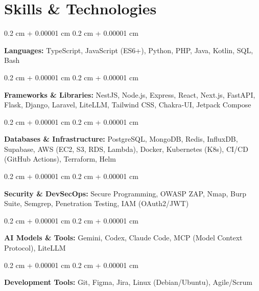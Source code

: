 \documentclass[10pt, letterpaper]{article}
\newenvironment{onecolentry}{
    \begin{adjustwidth}{
        0.2 cm + 0.00001 cm
    }{
        0.2 cm + 0.00001 cm
    }
}{
    \end{adjustwidth}
} %
\begin{document}
    \section{Skills \& Technologies}



        \begin{onecolentry}
            \textbf{Languages:} TypeScript, JavaScript (ES6+), Python, PHP, Java, Kotlin, SQL, Bash
        \end{onecolentry}

        \vspace{0.2 cm}

        \begin{onecolentry}
            \textbf{Frameworks \& Libraries:} NestJS, Node.js, Express, React, Next.js, FastAPI, Flask, Django, Laravel, LiteLLM, Tailwind CSS, Chakra-UI, Jetpack Compose
        \end{onecolentry}

        \vspace{0.2 cm}

        \begin{onecolentry}
            \textbf{Databases \& Infrastructure:} PostgreSQL, MongoDB, Redis, InfluxDB, Supabase, AWS (EC2, S3, RDS, Lambda), Docker, Kubernetes (K8s), CI/CD (GitHub Actions), Terraform, Helm
        \end{onecolentry}

        \vspace{0.2 cm}

        \begin{onecolentry}
            \textbf{Security \& DevSecOps:} Secure Programming, OWASP ZAP, Nmap, Burp Suite, Semgrep, Penetration Testing, IAM (OAuth2/JWT)
        \end{onecolentry}

        \vspace{0.2 cm}
        
        \begin{onecolentry}
            \textbf{AI Models \& Tools:} Gemini, Codex, Claude Code, MCP (Model Context Protocol), LiteLLM
        \end{onecolentry}

        \vspace{0.2 cm}
        
        \begin{onecolentry}
            \textbf{Development Tools:} Git, Figma, Jira, Linux (Debian/Ubuntu), Agile/Scrum
        \end{onecolentry}
\end{document}
